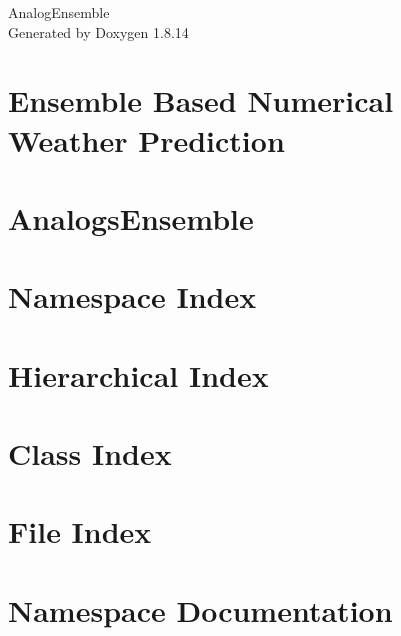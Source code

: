 \documentclass[twoside]{book}
\newcommand{\+}{\discretionary{\mbox{\scriptsize$\hookleftarrow$}}{}{}}
\newcommand{\clearemptydoublepage}{%
  \newpage{\pagestyle{empty}\cleardoublepage}%
}
\begin{document}
\hypersetup{pageanchor=false,
             bookmarksnumbered=true,
             pdfencoding=unicode
            }
\begin{titlepage}
\vspace*{7cm}
\begin{center}%
{\Large Analog\+Ensemble }\\
\vspace*{1cm}
{\large Generated by Doxygen 1.8.14}\\
\end{center}
\end{titlepage}
\clearemptydoublepage
{}
\tableofcontents
\clearemptydoublepage
{}
\hypersetup{pageanchor=true}

\chapter{Ensemble Based Numerical Weather Prediction}
\label{index}\hypertarget{index}{}
\chapter{Analogs\+Ensemble}
\label{md__r_e_a_d_m_e}

\chapter{Namespace Index}

\chapter{Hierarchical Index}

\chapter{Class Index}

\chapter{File Index}

\chapter{Namespace Documentation}



\end{document}
